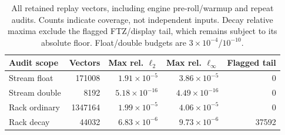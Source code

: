 \begin{table}[htbp]
\centering\small
\begin{tabular}{@{}lrrrr@{}}
\toprule
Audit scope & Vectors & Max rel. $\ell_2$ & Max rel. $\ell_\infty$ & Flagged tail \\
\midrule
Stream float & 171008 & $1.91\times10^{-5}$ & $3.86\times10^{-5}$ & 0 \\
Stream double & 8192 & $5.18\times10^{-16}$ & $4.49\times10^{-16}$ & 0 \\
Rack ordinary & 1347164 & $1.99\times10^{-5}$ & $4.06\times10^{-5}$ & 0 \\
Rack decay & 44032 & $6.83\times10^{-6}$ & $9.73\times10^{-6}$ & 37592 \\
\bottomrule
\end{tabular}
\caption{All retained replay vectors, including engine pre-roll/warmup and repeat audits. Counts indicate coverage, not independent inputs. Decay relative maxima exclude the flagged FTZ/display tail, which remains subject to its absolute floor. Float/double budgets are $3\times10^{-4}$/$10^{-10}$.}
\label{tab:study-numerical}
\end{table}
